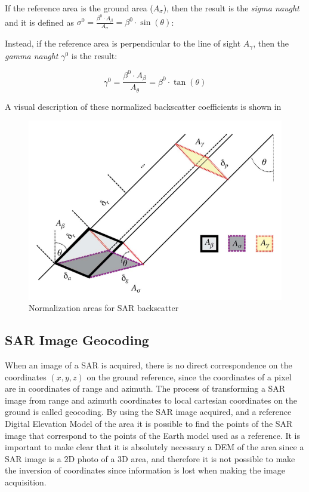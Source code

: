 If the reference area is the ground area ($A_\sigma$), then the result is the \textit{sigma naught} and it is defined as $\sigma^0 = \frac{\beta^0 \cdot A_\beta}{A_\sigma} = \beta^0 \cdot \sin(\theta)$:


Instead, if the reference area is perpendicular to the line of sight $A_\gamma$, then the \textit{gamma naught} $\gamma^0$ is the result:

\begin{equation}
    \gamma^0 = \frac{\beta^0 \cdot A_\beta}{A_\theta} = \beta^0 \cdot \tan(\theta)
\end{equation}{}

A visual description of these normalized backscatter coefficients is shown in 

\begin{figure}[H]
    \centering
    \includegraphics[width=0.8\linewidth]{Cap1/retang.png}
    \caption{Normalization areas for SAR backscatter \cite{Small}}
    \label{fig:normalization_areas}
\end{figure}


\subsection{SAR Image Geocoding}
\label{sec:sar_geocoding}

When an image of a SAR is acquired, there is no direct correspondence on the coordinates $(x,y,z)$ on the ground reference, since the coordinates of a pixel are in coordinates of range and azimuth. The process of transforming a SAR image from range and azimuth coordinates to local cartesian coordinates on the ground is called geocoding. By using the SAR image acquired, and a reference Digital Elevation Model of the area it is possible to find the points of the SAR image that correspond to the points of the Earth model used as a reference. It is important to make clear that it is absolutely necessary a DEM of the area since a SAR image is a 2D photo of a 3D area, and therefore it is not possible to make the inversion of coordinates since information is lost when making the image acquisition.

